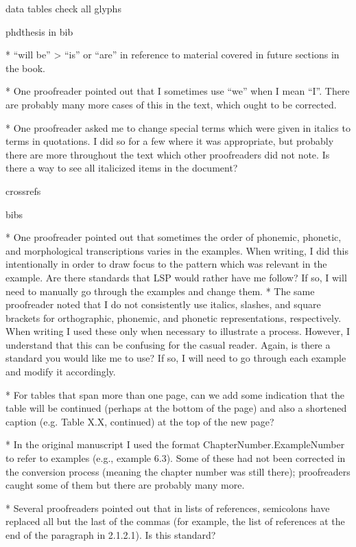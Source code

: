 data 
tables
check all glyphs  

phdthesis in bib
 
  
  *   “will be” > “is” or “are” in reference to material covered in future sections in the book.
 
  *   One proofreader pointed out that I sometimes use “we” when I mean “I”. There are probably many more cases of this in the text, which ought to be corrected.
  
  *   One proofreader asked me to change special terms which were given in italics to terms in quotations. I did so for a few where it was appropriate, but probably there are more throughout the text which other proofreaders did not note. Is there a way to see all italicized items in the document?
  
  crossrefs
  
  bibs
  
  
  
  *   One proofreader pointed out that sometimes the order of phonemic, phonetic, and morphological transcriptions varies in the examples. When writing, I did this intentionally in order to draw focus to the pattern which was relevant in the example. Are there standards that LSP would rather have me follow? If so, I will need to manually go through the examples and change them.
  *   The same proofreader noted that I do not consistently use italics, slashes, and square brackets for orthographic, phonemic, and phonetic representations, respectively. When writing I used these only when necessary to illustrate a process. However, I understand that this can be confusing for the casual reader. Again, is there a standard you would like me to use? If so, I will need to go through each example and modify it accordingly.
  
  
  *   For tables that span more than one page, can we add some indication that the table will be continued (perhaps at the bottom of the page) and also a shortened caption (e.g. Table X.X, continued) at the top of the new page? 
  
  *   In the original manuscript I used the format ChapterNumber.ExampleNumber to refer to examples (e.g., example 6.3). Some of these had not been corrected in the conversion process (meaning the chapter number was still there); proofreaders caught some of them but there are probably many more.
  
  *   Several proofreaders pointed out that in lists of references, semicolons have replaced all but the last of the commas (for example, the list of references at the end of the paragraph in 2.1.2.1). Is this standard?
  
